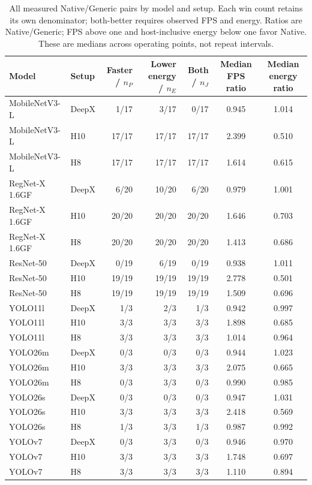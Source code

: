 \begingroup\small
\begin{longtable}{l l r r r S[table-format=1.3] S[table-format=1.3]}
\caption{All measured Native/Generic pairs by model and setup. Each win count retains its own denominator; both-better requires observed FPS and energy. Ratios are Native/Generic; FPS above one and host-inclusive energy below one favor Native. These are medians across operating points, not repeat intervals.}\\
\toprule
Model & Setup & Faster / $n_P$ & Lower energy / $n_E$ & Both / $n_J$ & {Median FPS ratio} & {Median energy ratio} \\
\midrule\endhead
MobileNetV3-L & DeepX & 1/17 & 3/17 & 0/17 & 0.945 & 1.014 \\
MobileNetV3-L & H10 & 17/17 & 17/17 & 17/17 & 2.399 & 0.510 \\
MobileNetV3-L & H8 & 17/17 & 17/17 & 17/17 & 1.614 & 0.615 \\
RegNet-X 1.6GF & DeepX & 6/20 & 10/20 & 6/20 & 0.979 & 1.001 \\
RegNet-X 1.6GF & H10 & 20/20 & 20/20 & 20/20 & 1.646 & 0.703 \\
RegNet-X 1.6GF & H8 & 20/20 & 20/20 & 20/20 & 1.413 & 0.686 \\
ResNet-50 & DeepX & 0/19 & 6/19 & 0/19 & 0.938 & 1.011 \\
ResNet-50 & H10 & 19/19 & 19/19 & 19/19 & 2.778 & 0.501 \\
ResNet-50 & H8 & 19/19 & 19/19 & 19/19 & 1.509 & 0.696 \\
YOLO11l & DeepX & 1/3 & 2/3 & 1/3 & 0.942 & 0.997 \\
YOLO11l & H10 & 3/3 & 3/3 & 3/3 & 1.898 & 0.685 \\
YOLO11l & H8 & 3/3 & 3/3 & 3/3 & 1.014 & 0.964 \\
YOLO26m & DeepX & 0/3 & 0/3 & 0/3 & 0.944 & 1.023 \\
YOLO26m & H10 & 3/3 & 3/3 & 3/3 & 2.075 & 0.665 \\
YOLO26m & H8 & 0/3 & 3/3 & 0/3 & 0.990 & 0.985 \\
YOLO26s & DeepX & 0/3 & 0/3 & 0/3 & 0.947 & 1.031 \\
YOLO26s & H10 & 3/3 & 3/3 & 3/3 & 2.418 & 0.569 \\
YOLO26s & H8 & 1/3 & 3/3 & 1/3 & 0.987 & 0.992 \\
YOLOv7 & DeepX & 0/3 & 3/3 & 0/3 & 0.946 & 0.970 \\
YOLOv7 & H10 & 3/3 & 3/3 & 3/3 & 1.748 & 0.697 \\
YOLOv7 & H8 & 3/3 & 3/3 & 3/3 & 1.110 & 0.894 \\
\bottomrule
\end{longtable}
\endgroup
